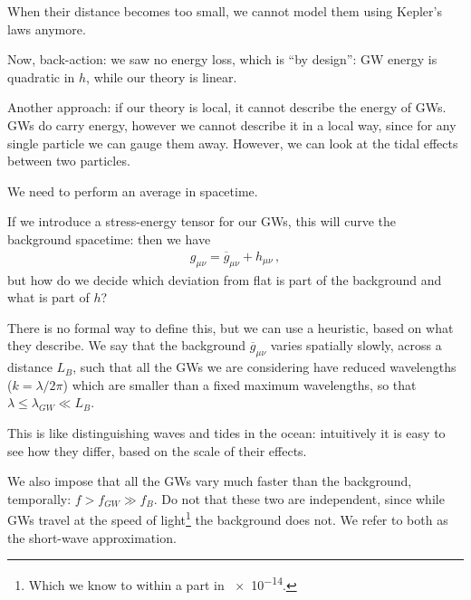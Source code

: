 \documentclass[main.tex]{subfiles}
\begin{document}


When their distance becomes too small, we cannot model them using Kepler's laws anymore. 

Now, back-action: we saw no energy loss, which is ``by design'': GW energy is quadratic in \(h\), while our theory is linear. 

Another approach: if our theory is local, it cannot describe the energy of GWs. 
GWs do carry energy, however we cannot describe it in a local way, since for any single particle we can gauge them away. However, we can look at the tidal effects between two particles. 

We need to perform an average in spacetime. 

If we introduce a stress-energy tensor for our GWs, this will curve the background spacetime: then we have 
%
\begin{align}
g_{\mu \nu } = \overline{g}_{\mu \nu } + h_{\mu \nu }
\,,
\end{align}
%
but how do we decide which deviation from flat is part of the background and what is part of \(h\)?

There is no formal way to define this, but we can use a heuristic, based on what they describe. 
We say that the background \(\overline{g}_{\mu \nu }\) varies spatially slowly, across a distance \(L_B\), such that all the GWs we are considering have reduced wavelengths (\(k = \lambda /2 \pi \)) which are smaller than a fixed maximum wavelengths, so that \(\lambda  \leq \lambda_{GW} \ll L_B\). 

This is like distinguishing waves and tides in the ocean: intuitively it is easy to see how they differ, based on the scale of their effects.

We also impose that all the GWs vary much faster than the background, temporally: \(f > f_{GW} \gg f_B\). 
Do not that these two are independent, since while GWs travel at the speed of light\footnote{Which we know to within a part in \num{e-14}.} the background does not. 
We refer to both as the short-wave approximation. 
\end{document}
